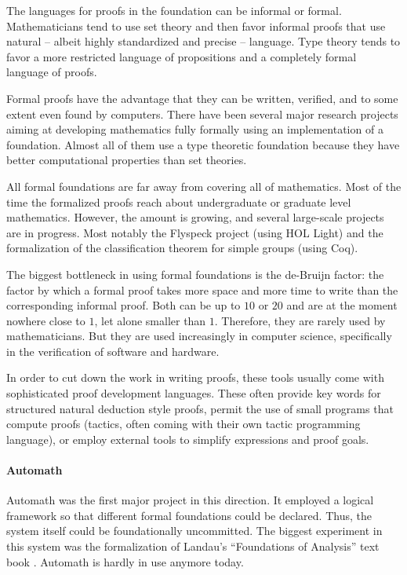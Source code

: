 The languages for proofs in the foundation can be informal or formal. Mathematicians tend to use set theory and then favor informal proofs that use natural -- albeit highly standardized and precise -- language. Type theory tends to favor a more restricted language of propositions and a completely formal language of proofs.

Formal proofs have the advantage that they can be written, verified, and to some extent even found by computers. There have been several major research projects aiming at developing mathematics fully formally using an implementation of a foundation. Almost all of them use a type theoretic foundation because they have better computational properties than set theories.

All formal foundations are far away from covering all of mathematics. Most of the time the formalized proofs reach about undergraduate or graduate level mathematics. However, the amount is growing, and several large-scale projects are in progress. Most notably the Flyspeck project \cite{flyspeck} (using HOL Light) and the formalization of the classification theorem for simple groups \cite{finitegroups1} (using Coq).

The biggest bottleneck in using formal foundations is the de-Bruijn factor: the factor by which a formal proof takes more space and more time to write than the corresponding informal proof. Both can be up to $10$ or $20$ and are at the moment nowhere close to $1$, let alone smaller than $1$. Therefore, they are rarely used by mathematicians. But they are used increasingly in computer science, specifically in the verification of software and hardware.

In order to cut down the work in writing proofs, these tools usually come with sophisticated proof development languages. These often provide key words for structured natural deduction style proofs, permit the use of small programs that compute proofs (tactics, often coming with their own tactic programming language), or employ external tools to simplify expressions and proof goals.

\paragraph{Automath}
Automath \cite{automath} was the first major project in this direction. It employed a logical framework so that different formal foundations could be declared. Thus, the system itself could be foundationally uncommitted. The biggest experiment in this system was the formalization of Landau's ``Foundations of Analysis'' text book \cite{landau_automath}. Automath is hardly in use anymore today.

